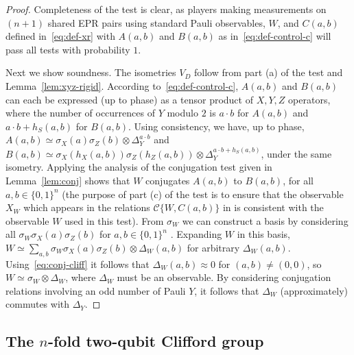 \documentclass[11pt]{article}
\theoremstyle{remark}
\theoremstyle{definition}
\newcommand{\eps}{\varepsilon}
\begin{document}
\begin{proof}
 Completeness of the test is clear, as players making measurements on $(n+1)$ shared EPR pairs using standard Pauli observables, $W$, and $C(a,b)$ defined in~\eqref{eq:def-xr} with $A(a,b)$ and $B(a,b)$ as in~\eqref{eq:def-control-c} will pass all tests with probability $1$. 

Next we show soundness. The isometries $V_D$ follow from part (a) of the test and Lemma~\ref{lem:xyz-rigid}.
According to~\eqref{eq:def-control-c}, $A(a,b)$ and $B(a,b)$ can each be expressed (up to phase) as a tensor product of $X,Y,Z$ operators, where the number of occurrences of $Y$ modulo $2$ is $a\cdot b$ for $A(a,b)$ and $a\cdot b + h_S(a,b)$ for $B(a,b)$. Using consistency, we have, up to phase, $A(a,b) \simeq \sigma_X(a)\sigma_Z(b) \otimes \Delta_Y^{a\cdot b}$ and $B(a,b) \simeq \sigma_X(h_X(a,b)) \sigma_Z(h_Z(a,b)) \otimes \Delta_Y^{a\cdot b + h_S(a,b)}$, under the same isometry. Applying the analysis of the conjugation test given in Lemma~\ref{lem:conj} shows that $W$ conjugates $A(a,b)$ to $B(a,b)$, for all $a,b\in\{0,1\}^n$ (the  purpose of part (c) of the test is to ensure that the observable $X_W$ which appears in the relations $\mathcal{C}\{W,C(a,b)\}$ in is consistent with the observable $W$ used in this test). From $\sigma_W$ we can construct a basis by considering all $\sigma_W \sigma_X(a)\sigma_Z(b)$ for $a,b\in\{0,1\}^n$ . Expanding $W$ in this basis, $W \simeq \sum_{a,b} \sigma_W \sigma_X(a)\sigma_Z(b)\otimes \Delta_W(a,b)$ for arbitrary $\Delta_W(a,b)$. Using~\eqref{eq:conj-cliff} it follows that $\Delta_W(a,b) \approx 0$ for $(a,b)\neq (0,0)$, so $W \simeq \sigma_W \otimes \Delta_W$, where $\Delta_W$ must be an observable. By considering conjugation relations involving an odd number of Pauli $Y$, it follows that $\Delta_W$ (approximately) commutes with $\Delta_Y$. 
\end{proof}

\subsection{The $n$-fold two-qubit Clifford group}
\label{sec:n-2-clifford}
\end{document}
